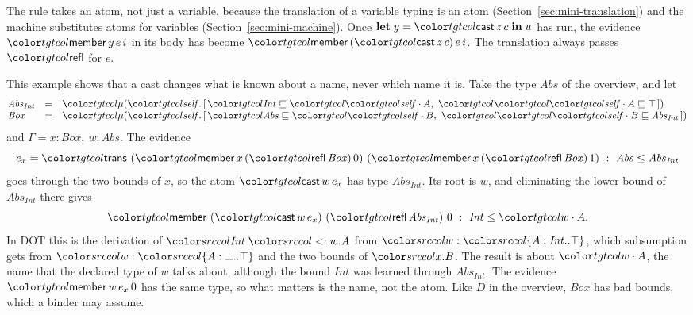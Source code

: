 The rule takes an atom, not just a variable, because the translation of a variable typing is an atom (Section~\ref{sec:mini-translation}) and the machine substitutes atoms for variables (Section~\ref{sec:mini-machine}). Once $\klet y = \ev{cast}\,z\,c \kin u$ has run, the evidence $\ev{member}\,y\,e\,i$ in its body has become $\ev{member}\,(\ev{cast}\,z\,c)\,e\,i$. The translation always passes $\ev{refl}$ for $e$.

\begin{example}\label{ex:mini-cast}
This example shows that a cast changes what is known about a name, never which name it is. Take the type $\mathit{Abs}$ of the overview, and let
\[
\begin{array}{@{}lcl@{}}
\mathit{Abs}_{\mathit{Int}} & = & \obj{[\,\ple{\mathit{Int}}{\sel{\self}{A}},\ \ple{\sel{\self}{A}}{\top}\,]} \\
\mathit{Box} & = & \obj{[\,\ple{\mathit{Abs}}{\sel{\self}{B}},\ \ple{\sel{\self}{B}}{\mathit{Abs}_{\mathit{Int}}}\,]}
\end{array}
\]
and $\Gamma = x : \mathit{Box},\ w : \mathit{Abs}$. The evidence
\[
e_x = \ev{trans}\ (\ev{member}\,x\,(\ev{refl}\,\mathit{Box})\,0)\ (\ev{member}\,x\,(\ev{refl}\,\mathit{Box})\,1) \ :\ \mathit{Abs} \le \mathit{Abs}_{\mathit{Int}}
\]
goes through the two bounds of $x$, so the atom $\ev{cast}\,w\,e_x$ has type $\mathit{Abs}_{\mathit{Int}}$. Its root is $w$, and eliminating the lower bound of $\mathit{Abs}_{\mathit{Int}}$ there gives
\[
\ev{member}\ (\ev{cast}\,w\,e_x)\ (\ev{refl}\,\mathit{Abs}_{\mathit{Int}})\ 0 \ :\ \mathit{Int} \le \sel{w}{A} .
\]
In DOT this is the derivation of $\src{\mathit{Int} \sub w.A}$ from $\src{w : \dtyp{A}{\mathit{Int}}{\top}}$, which subsumption gets from $\src{w : \dtyp{A}{\bot}{\top}}$ and the two bounds of $\src{x.B}$. The result is about $\sel{w}{A}$, the name that the declared type of $w$ talks about, although the bound $\mathit{Int}$ was learned through $\mathit{Abs}_{\mathit{Int}}$. The evidence $\ev{member}\,w\,e_x\,0$ has the same type, so what matters is the name, not the atom. Like $D$ in the overview, $\mathit{Box}$ has bad bounds, which a binder may assume.
\end{example}

